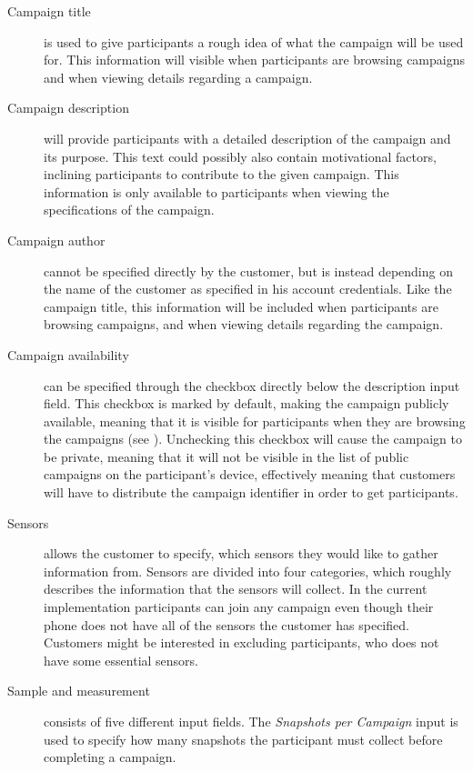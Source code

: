 \begin{description}
    \item[Campaign title] is used to give participants a rough idea of what the campaign will be used for. This information will visible when participants are browsing campaigns and when viewing details regarding a campaign.

    \item[Campaign description] will provide participants with a detailed description of the campaign and its purpose. This text could possibly also contain motivational factors, inclining participants to contribute to the given campaign. This information is only available to participants when viewing the specifications of the campaign.

    \item[Campaign author] cannot be specified directly by the customer, but is instead depending on the name of the customer as specified in his account credentials. Like the campaign title, this information will be included when participants are browsing campaigns, and when viewing details regarding the campaign.

    \item[Campaign availability] can be specified through the checkbox directly below the description input field. This checkbox is marked by default, making the campaign publicly available, meaning that it is visible for participants when they are browsing the campaigns (see ). Unchecking this checkbox will cause the campaign to be private, 
    meaning that it will not be visible in the list of public campaigns on the participant's device, effectively meaning that customers will have to distribute the campaign identifier in order to get participants.

    \item[Sensors] allows the customer to specify, which sensors they would like to gather information from. Sensors are divided into four categories, which roughly describes the information that the sensors will collect. In the current implementation participants can join any campaign even though their phone does not have all of the sensors the customer has specified. Customers might be interested in excluding participants, who does not have some essential sensors.

    \item[Sample and measurement] consists of five different input fields. The \emph{Snapshots per Campaign} input is used to specify how many snapshots the participant must collect before completing a campaign.


\end{description}
